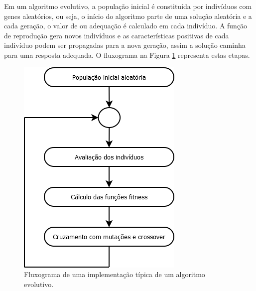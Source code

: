 Em um algoritmo evolutivo, a população inicial é constituída por indivíduos com genes aleatórios, ou seja, o início do algoritmo parte de uma solução aleatória e a cada geração, o valor de \fitness ou adequação é calculado em cada indivíduo. A função de reprodução gera novos indivíduos e as características positivas de cada indivíduo podem ser propagadas para a nova geração, assim a solução caminha para uma resposta adequada. O fluxograma na Figura \ref{figura:fluxograma_ae} representa estas etapas.

\begin{figure}[htb]
    \caption{Fluxograma de uma implementação típica de um algoritmo evolutivo.}
    \label{figura:fluxograma_ae}
    \centering
    \includegraphics[scale=1]{images/dia/fluxograma-ae}
    \fautor
\end{figure}